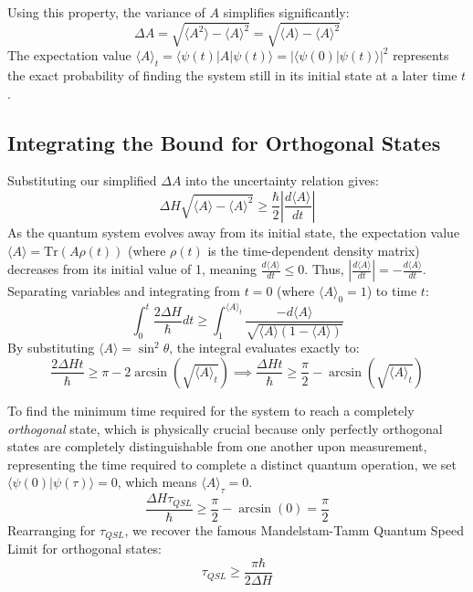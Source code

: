 Using this property, the variance of $A$ simplifies significantly:
\begin{equation}
    \Delta A = \sqrt{\langle A^2 \rangle - \langle A \rangle^2} = \sqrt{\langle A \rangle - \langle A \rangle^2}
\end{equation}
The expectation value $\langle A \rangle_t = \langle \psi(t) | A | \psi(t) \rangle = |\langle \psi(0) | \psi(t) \rangle|^2$ represents the exact probability of finding the system still in its initial state at a later time $t$. 

\subsection{Integrating the Bound for Orthogonal States}
Substituting our simplified $\Delta A$ into the uncertainty relation gives:
\begin{equation}
    \Delta H \sqrt{\langle A \rangle - \langle A \rangle^2} \ge \frac{\hbar}{2} \left| \frac{d\langle A \rangle}{dt} \right|
\end{equation}
As the quantum system evolves away from its initial state, the expectation value $\langle A \rangle = \text{Tr}(A\rho(t))$ (where $\rho(t)$ is the time-dependent density matrix) decreases from its initial value of 1, meaning $\frac{d\langle A \rangle}{dt} \le 0$. Thus, $\left| \frac{d\langle A \rangle}{dt} \right| = - \frac{d\langle A \rangle}{dt}$. Separating variables and integrating from $t=0$ (where $\langle A \rangle_0 = 1$) to time $t$:
\begin{equation}
    \int_0^t \frac{2 \Delta H}{\hbar} dt \ge \int_{1}^{\langle A \rangle_t} \frac{-d\langle A \rangle}{\sqrt{\langle A \rangle (1 - \langle A \rangle)}}
\end{equation}
By substituting $\langle A \rangle = \sin^2\theta$, the integral evaluates exactly to:
\begin{equation}
    \frac{2 \Delta H t}{\hbar} \ge \pi - 2 \arcsin(\sqrt{\langle A \rangle_t}) \implies \frac{\Delta H t}{\hbar} \ge \frac{\pi}{2} - \arcsin(\sqrt{\langle A \rangle_t})
\end{equation}

To find the minimum time required for the system to reach a completely \textit{orthogonal} state, which is physically crucial because only perfectly orthogonal states are completely distinguishable from one another upon measurement, representing the time required to complete a distinct quantum operation, we set $\langle \psi(0) | \psi(\tau) \rangle = 0$, which means $\langle A \rangle_\tau = 0$.
\begin{equation}
    \frac{\Delta H \tau_{QSL}}{\hbar} \ge \frac{\pi}{2} - \arcsin(0) = \frac{\pi}{2}
\end{equation}
Rearranging for $\tau_{QSL}$, we recover the famous Mandelstam-Tamm Quantum Speed Limit for orthogonal states:
\begin{equation}
    \tau_{QSL} \ge \frac{\pi \hbar}{2 \Delta H}
\end{equation}

